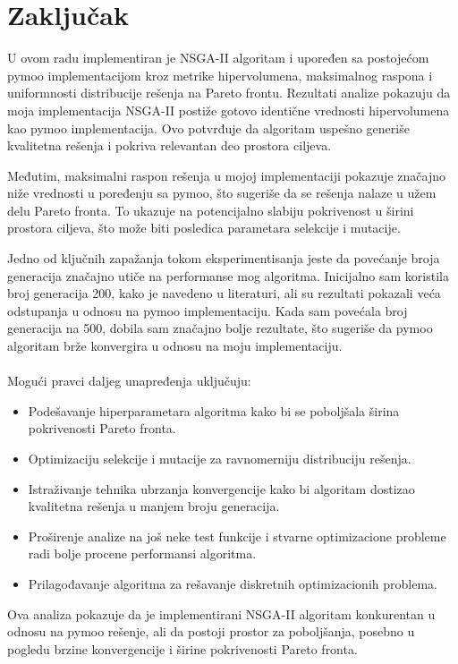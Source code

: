 \documentclass[12pt]{article}
\begin{document}
\section{Zaključak}
U ovom radu implementiran je NSGA-II algoritam i upoređen sa postojećom pymoo implementacijom kroz metrike hipervolumena, maksimalnog raspona i uniformnosti distribucije rešenja na Pareto frontu.
Rezultati analize pokazuju da moja implementacija NSGA-II postiže gotovo identične vrednosti hipervolumena kao pymoo implementacija. Ovo potvrđuje da algoritam uspešno generiše kvalitetna rešenja i pokriva relevantan deo prostora ciljeva.

Međutim, maksimalni raspon rešenja u mojoj implementaciji pokazuje značajno niže vrednosti u poređenju sa pymoo, što sugeriše da se rešenja nalaze u užem delu Pareto fronta. To ukazuje na potencijalno slabiju pokrivenost u širini prostora ciljeva, što može biti posledica parametara selekcije i mutacije.

Jedno od ključnih zapažanja tokom eksperimentisanja jeste da povećanje broja generacija značajno utiče na performanse mog algoritma. Inicijalno sam koristila broj generacija 200, kako je navedeno u literaturi, ali su rezultati pokazali veća odstupanja u odnosu na pymoo implementaciju. Kada sam povećala broj generacija na 500, dobila sam značajno bolje rezultate, što sugeriše da pymoo algoritam brže konvergira u odnosu na moju implementaciju.
\\
\\
Mogući pravci daljeg unapređenja uključuju:

\begin{itemize}
    \item Podešavanje hiperparametara algoritma kako bi se poboljšala širina pokrivenosti Pareto fronta.
    \item Optimizaciju selekcije i mutacije za ravnomerniju distribuciju rešenja.
    \item Istraživanje tehnika ubrzanja konvergencije kako bi algoritam dostizao kvalitetna rešenja u manjem broju generacija.
    \item Proširenje analize na još neke test funkcije i stvarne optimizacione probleme radi bolje procene performansi algoritma.
	\item Prilagođavanje algoritma za rešavanje diskretnih optimizacionih problema.
\end{itemize}

Ova analiza pokazuje da je implementirani NSGA-II algoritam konkurentan u odnosu na pymoo rešenje, ali da postoji prostor za poboljšanja, posebno u pogledu brzine konvergencije i širine pokrivenosti Pareto fronta.
\end{document}
